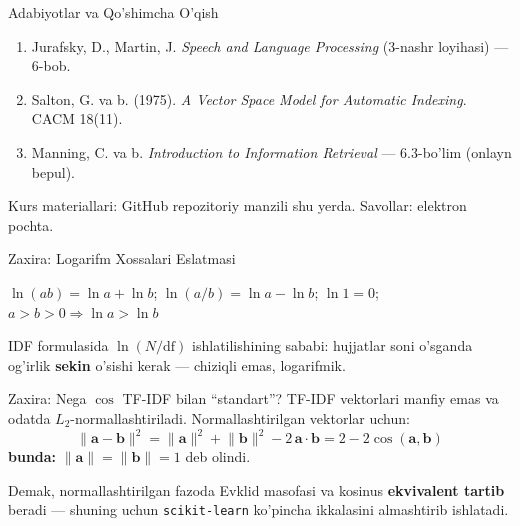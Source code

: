 \documentclass[aspectratio=169,11pt]{beamer}
\newcommand{\bunda}[1]{{\small\textbf{bunda:}\; #1}}
\begin{document}
\begin{frame}{Adabiyotlar va Qo'shimcha O'qish}
  \small
  \begin{enumerate}\setlength\itemsep{4pt}
    \item Jurafsky, D., Martin, J. \textit{Speech and Language
          Processing} (3-nashr loyihasi) --- 6-bob.
    \item Salton, G. va b. (1975). \textit{A Vector Space Model
          for Automatic Indexing}. CACM 18(11).
    \item Manning, C. va b. \textit{Introduction to Information
          Retrieval} --- 6.3-bo'lim (onlayn bepul).
  \end{enumerate}
  \vspace{0.5em}
  {\scriptsize\color{halfgray}Kurs materiallari: GitHub repozitoriy
  manzili shu yerda. Savollar: elektron pochta.}
\end{frame}

\appendix

\begin{frame}{Zaxira: Logarifm Xossalari Eslatmasi}
  \begin{tcolorbox}[defbox,title=Kerakli xossalar]
    \small
    $\ln(ab) = \ln a + \ln b$;\qquad
    $\ln(a/b) = \ln a - \ln b$;\qquad
    $\ln 1 = 0$;\qquad
    $a > b > 0 \Rightarrow \ln a > \ln b$
  \end{tcolorbox}
  \vspace{0.3em}
  \small IDF formulasida $\ln(N/\mathrm{df})$ ishlatilishining sababi:
  hujjatlar soni o'sganda og'irlik \textbf{sekin} o'sishi kerak ---
  chiziqli emas, logarifmik.
\end{frame}

\begin{frame}{Zaxira: Nega $\cos$ TF-IDF bilan ``standart''?}
  \small TF-IDF vektorlari manfiy emas va odatda $L_2$-normallashtiriladi.
  Normallashtirilgan vektorlar uchun:
  $$\lVert\mathbf{a}-\mathbf{b}\rVert^2
    = \lVert\mathbf{a}\rVert^2 + \lVert\mathbf{b}\rVert^2
      - 2\,\mathbf{a}\cdot\mathbf{b}
    = 2 - 2\cos(\mathbf{a},\mathbf{b})$$
  \bunda{$\lVert\mathbf{a}\rVert=\lVert\mathbf{b}\rVert=1$ deb olindi.}
  \vspace{0.3em}

  Demak, normallashtirilgan fazoda Evklid masofasi va kosinus
  \textbf{ekvivalent tartib} beradi --- shuning uchun
  \texttt{scikit-learn} ko'pincha ikkalasini almashtirib ishlatadi.
\end{frame}
\end{document}

